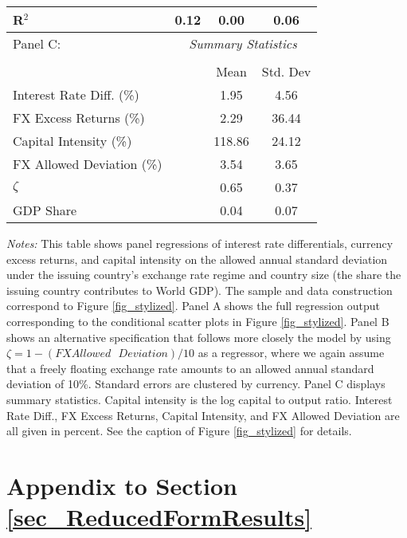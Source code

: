 \begin{table}[htp!]
\begin{center}
\begin{tabular}{l c c c }
      R$^2$       & 0.12           & 0.00          & 0.06           \\
      \hline
      Panel C: & \multicolumn{3}{c}{\emph{Summary Statistics}} \\
      \cline{2 - 4} \vspace{-1em} \\ 
               & & Mean & Std. Dev \\
      \hline
      Interest Rate Diff. (\%) &  & 1.95 & 4.56 \\ 
      FX Excess Returns (\%) &  & 2.29 & 36.44  \\ 
      Capital Intensity (\%) & & 118.86 & 24.12 \\ 
      FX Allowed Deviation (\%) & & 3.54 & 3.65 \\ 
      $\zeta$ & & 0.65 & 0.37 \\ 
      GDP Share & & 0.04 & 0.07  \\ 
      \hline
      \hline
    \end{tabular}
  \end{center}
  \small\textit{Notes: } This table shows panel regressions of
  interest rate differentials, currency excess returns, and capital
  intensity on the allowed annual standard deviation under the issuing
  country's exchange rate regime and country size (the share the
  issuing country contributes to World GDP). The sample and data
  construction correspond to Figure \ref{fig_stylized}. Panel A shows
  the full regression output corresponding to the conditional scatter
  plots in Figure \ref{fig_stylized}. Panel B shows an alternative
  specification that follows more closely the model by using
  $\zeta=1-(FX\text{}Allowed\text{ }Deviation)/10 $ as a regressor,
  where we again assume that a freely floating exchange rate amounts
  to an allowed annual standard deviation of 10\%. Standard errors are
  clustered by currency. Panel C displays summary statistics. Capital
  intensity is the log capital to output ratio. Interest Rate Diff.,
  FX Excess Returns, Capital Intensity, and FX Allowed Deviation are
  all given in percent. See the caption of Figure \ref{fig_stylized}
  for details.
\end{table}


\clearpage

\section{Appendix to Section \ref{sec_ReducedFormResults}
  \label{Appendix_ReducedFormResults}}

